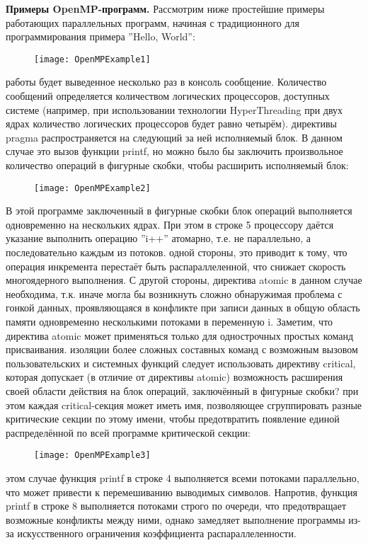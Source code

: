 {	\par\textbf{Примеры OpenMP-программ.} Рассмотрим ниже простейшие примеры работающих параллельных программ, начиная с традиционного для программирования примера ''Hello, World'':
	\begin{figure}[H]
		\texttt{[image: OpenMPExample1]}
	\end{figure}
	 работы будет выведенное несколько раз в консоль сообщение. Количество сообщений определяется количеством логических процессоров, доступных системе (например, при использовании технологии HyperThreading при двух ядрах количество логических процессоров будет равно четырём). 
	 директивы pragma распространяется на следующий за ней исполняемый блок. В данном случае это вызов функции printf, но можно было бы заключить произвольное количество операций в фигурные скобки, чтобы расширить исполняемый блок:
	\begin{figure}[H]
		\texttt{[image: OpenMPExample2]}
	\end{figure}
	В этой программе заключенный в фигурные скобки блок операций выполняется одновременно на нескольких ядрах. При этом в строке 5 процессору даётся указание выполнить операцию ''i++'' атомарно, т.е. не параллельно, а последовательно каждым из потоков. 
	 одной стороны, это приводит к тому, что операция инкремента перестаёт быть распараллеленной, что снижает скорость многоядерного выполнения. С другой стороны, директива atomic в данном случае необходима, т.к. иначе могла бы возникнуть сложно обнаружимая проблема с гонкой данных, проявляющаяся в конфликте при записи данных в общую область памяти одновременно несколькими потоками в переменную i. Заметим, что директива atomic может применяться только для однострочных простых команд присваивания. 
	 изоляции более сложных составных команд с возможным вызовом пользовательских и системных функций следует использовать директиву critical, которая допускает (в отличие от директивы atomic) возможность расширения своей области действия на блок операций, заключённый в фигурные скобки? при этом каждая critical-секция может иметь имя, позволяющее сгруппировать разные критические секции по этому имени, чтобы предотвратить появление единой распределённой по всей программе критической секции:
	\begin{figure}[H]
		\texttt{[image: OpenMPExample3]}
	\end{figure}
	 этом случае функция printf в строке 4 выполняется всеми потоками параллельно, что может привести к перемешиванию выводимых символов. Напротив, функция printf в строке 8 выполняется потоками строго по очереди, что предотвращает возможные конфликты между ними, однако замедляет выполнение программы из-за искусственного ограничения коэффициента распараллеленности.
}
